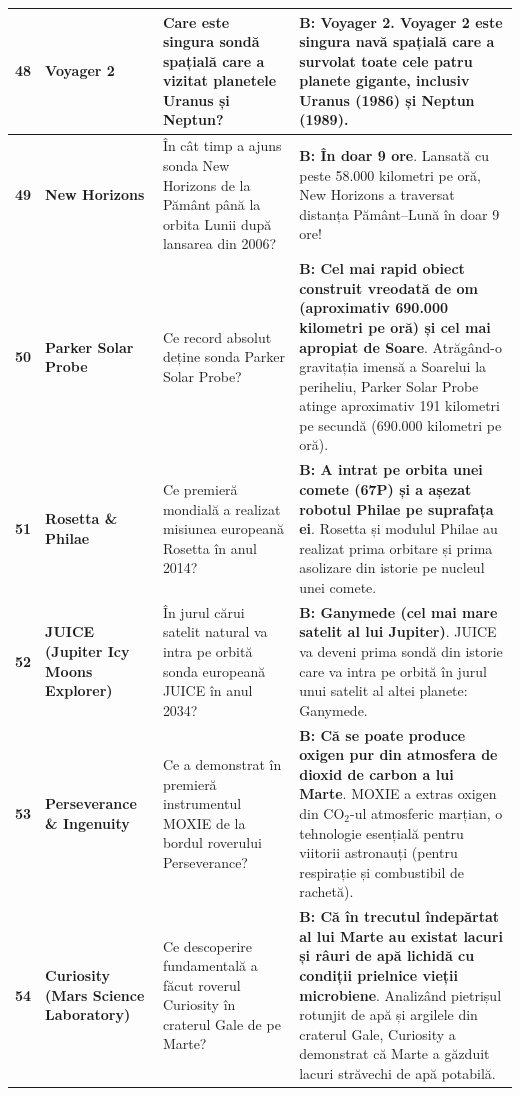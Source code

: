 \begin{longtable}{@{}r >{\raggedright\arraybackslash}p{2.7cm} >{\raggedright\arraybackslash}p{4.8cm} >{\raggedright\arraybackslash}p{6.5cm}@{}}
\textbf{48} & \textbf{Voyager 2} & Care este singura sondă spațială care a vizitat planetele Uranus și Neptun? & \textbf{B: Voyager 2}. {\footnotesize Voyager 2 este singura navă spațială care a survolat toate cele patru planete gigante, inclusiv Uranus (1986) și Neptun (1989).} \\ \midrule
\textbf{49} & \textbf{New Horizons} & În cât timp a ajuns sonda New Horizons de la Pământ până la orbita Lunii după lansarea din 2006? & \textbf{B: În doar 9 ore}. {\footnotesize Lansată cu peste 58.000 kilometri pe oră, New Horizons a traversat distanța Pământ--Lună în doar 9 ore!} \\ \midrule
\textbf{50} & \textbf{Parker Solar Probe} & Ce record absolut deține sonda Parker Solar Probe? & \textbf{B: Cel mai rapid obiect construit vreodată de om (aproximativ 690.000 kilometri pe oră) și cel mai apropiat de Soare}. {\footnotesize Atrăgând-o gravitația imensă a Soarelui la periheliu, Parker Solar Probe atinge aproximativ 191 kilometri pe secundă (690.000 kilometri pe oră).} \\ \midrule
\textbf{51} & \textbf{Rosetta \& Philae} & Ce premieră mondială a realizat misiunea europeană Rosetta în anul 2014? & \textbf{B: A intrat pe orbita unei comete (67P) și a așezat robotul Philae pe suprafața ei}. {\footnotesize Rosetta și modulul Philae au realizat prima orbitare și prima asolizare din istorie pe nucleul unei comete.} \\ \midrule
\textbf{52} & \textbf{JUICE (Jupiter Icy Moons Explorer)} & În jurul cărui satelit natural va intra pe orbită sonda europeană JUICE în anul 2034? & \textbf{B: Ganymede (cel mai mare satelit al lui Jupiter)}. {\footnotesize JUICE va deveni prima sondă din istorie care va intra pe orbită în jurul unui satelit al altei planete: Ganymede.} \\ \midrule
\textbf{53} & \textbf{Perseverance \& Ingenuity} & Ce a demonstrat în premieră instrumentul MOXIE de la bordul roverului Perseverance? & \textbf{B: Că se poate produce oxigen pur din atmosfera de dioxid de carbon a lui Marte}. {\footnotesize MOXIE a extras oxigen din CO$_2$-ul atmosferic marțian, o tehnologie esențială pentru viitorii astronauți (pentru respirație și combustibil de rachetă).} \\ \midrule
\textbf{54} & \textbf{Curiosity (Mars Science Laboratory)} & Ce descoperire fundamentală a făcut roverul Curiosity în craterul Gale de pe Marte? & \textbf{B: Că în trecutul îndepărtat al lui Marte au existat lacuri și râuri de apă lichidă cu condiții prielnice vieții microbiene}. {\footnotesize Analizând pietrișul rotunjit de apă și argilele din craterul Gale, Curiosity a demonstrat că Marte a găzduit lacuri străvechi de apă potabilă.} \\ \midrule

\end{longtable}
